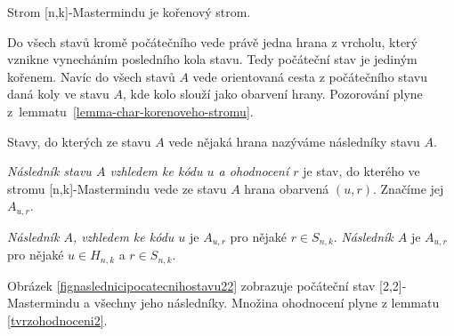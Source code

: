 \begin{pozorovani}
    Strom [n,k]-Mastermindu je kořenový strom.
\end{pozorovani}
\begin{dukaz}
    Do všech stavů kromě počátečního vede právě jedna hrana z vrcholu, který vznikne vynecháním posledního kola stavu. Tedy počáteční stav je jediným kořenem. Navíc do všech stavů $A$ vede orientovaná cesta z počátečního stavu daná koly ve stavu $A$, kde kolo slouží jako obarvení hrany. Pozorování plyne z~lemmatu~\ref{lemma-char-korenoveho-stromu}.


    
\end{dukaz}

Stavy, do kterých ze stavu $A$ vede nějaká hrana nazýváme následníky stavu $A$. 

\begin{definice}\label{potomek}
  
  \emph{Následník stavu $A$ vzhledem ke kódu $u$ a ohodnocení $r$} je stav, do kterého ve stromu [n,k]-Mastermindu vede ze stavu $A$ hrana obarvená $(u,r)$. Značíme jej $A_{u,r}$. 
  
\end{definice}
\begin{pozn}
    \emph{Následník $A$, vzhledem ke kódu $u$} je $A_{u,r}$ pro nějaké $r \in S_{n,k}$. \emph{Následník $A$} je $A_{u,r}$ pro nějaké $u\in H_{n,k}$ a $r \in S_{n,k}$. 
\end{pozn}
Obrázek \ref{fignaslednicipocatecnihostavu22} zobrazuje počáteční stav [2,2]-Mastermindu a všechny jeho následníky. Množina ohodnocení plyne z lemmatu \ref{tvrzohodnoceni2}.

